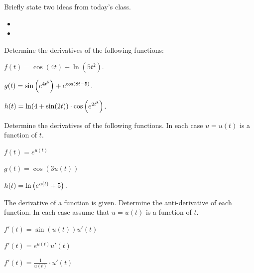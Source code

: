 \postClass

\begin{problem}
\item Briefly state two ideas from today's class.
  \begin{itemize}
  \item 
  \item 
  \end{itemize}
\item 
  \begin{subproblem}
    \item
  \end{subproblem}
\end{problem}



\begin{problem}
\item Determine the derivatives of the following functions:
  \begin{subproblem}
  \item $f(t) = \cos(4t) + \ln(5t^2)$.
    \vfill
  \item $g(t) = \sin\left( e^{4t^5} \right)  + e^{\cos\left( 8t-5 \right)}$.
    \vfill
  \item $h(t) = \ln(4+\sin(2t) ) \cdot \cos \left( e^{2t^8} \right)$.
    \vfill
  \end{subproblem}
\end{problem}


\begin{problem}
\item Determine the derivatives of the following functions. In each
  case $u=u(t)$ is a function of $t$.
  \begin{subproblem}
    \item $f(t) = e^{u(t)}$
      \vfill
    \item $g(t) = \cos(3 u(t)) $
      \vfill
    \item $h(t) = \ln\left( e^{u(t)} + 5 \right).$
      \vfill
  \end{subproblem}

  \clearpage

\item The derivative of a function is given. Determine the
  anti-derivative of each function. In each case assume that $u=u(t)$
  is a function of $t$.
  \begin{subproblem}
  \item $f'(t) = \sin(u(t)) u'(t)$
    \vfill
  \item $f'(t) = e^{u(t)} u'(t)$
    \vfill
  \item $f'(t) = \frac{1}{u(t)} \cdot u'(t)$
    \vfill
  \end{subproblem}
\end{problem}

